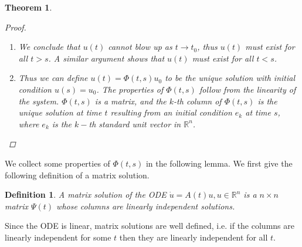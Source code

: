 \documentclass{article}
\newtheorem{theorem}{Theorem}[section]
\newtheorem{definition}{Definition}[section]
\def\R{{\mathbb R}}
\begin{document}
\begin{theorem}
\begin{proof}
\begin{enumerate}
\begin{align*}
\end{align*}
where the bound holds uniformly for $t \in [s, t_0)$ since it does not depend on $t$.
\item We conclude that $u(t)$ cannot blow up as $t \rightarrow t_0$, thus $u(t)$ must exist for all $t > s$. A similar argument shows that $u(t)$ must exist for all $t < s$.
\item Thus we can define $u(t) = \Phi(t, s)u_0$ to be the unique solution with initial condition $u(s) = u_0$. The properties of $\Phi(t,s)$ follow from the linearity of the system. $\Phi(t,s)$ is a matrix, and the $k$-th column of $\Phi(t,s)$ is the unique solution at time $t$ resulting from an initial condition $e_k$ at time $s$, where $e_k$ is the $k-$th standard unit vector in $\R^n$. 
\end{enumerate}
\end{proof}
\end{theorem}

We collect some properties of $\Phi(t,s)$ in the following lemma. We first give the following definition of a matrix solution.

\begin{definition}A \emph{matrix solution} of the ODE $\dot{u} = A(t)u, u \in \R^n$ is a $n \times n$ matrix $\Psi(t)$ whose columns are linearly independent solutions.
\end{definition}

Since the ODE is linear, matrix solutions are well defined, i.e. if the columns are linearly independent for some $t$ then they are linearly independent for all $t$.
\end{document}
